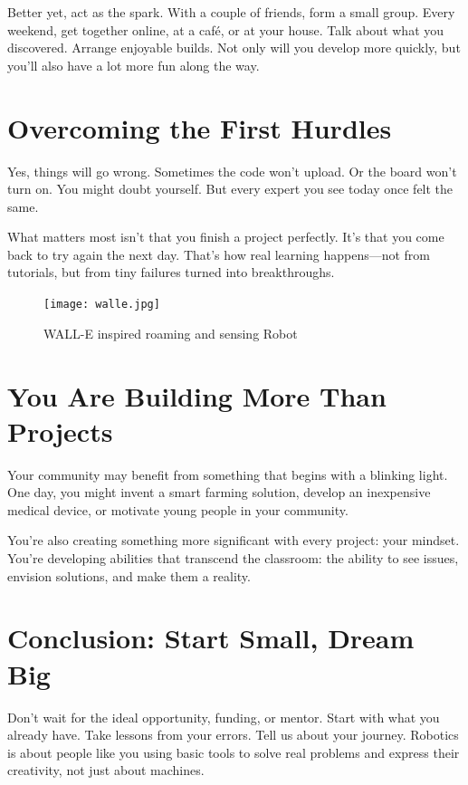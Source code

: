 \documentclass[a4paper,10pt,twocolumn]{memoir}
\begin{document}
Better yet, act as the spark. With a couple of friends, form a small group. Every weekend, get together online, at a café, or at your house. Talk about what you discovered. Arrange enjoyable builds. Not only will you develop more quickly, but you’ll also have a lot more fun along the way.
\section*{Overcoming the First Hurdles}
Yes, things will go wrong. Sometimes the code won’t upload. Or the board won’t turn on. You might doubt yourself. But every expert you see today once felt the same.

What matters most isn’t that you finish a project perfectly. It’s that you come back to try again the next day. That’s how real learning happens—not from tutorials, but from tiny failures turned into breakthroughs.
\begin{figure}[ht]
  \centering
  \texttt{[image: walle.jpg]}
  \caption*{WALL-E inspired roaming and sensing Robot}
  \label{fig2}
\end{figure}
\section*{You Are Building More Than Projects}
Your community may benefit from something that begins with a blinking light. One day, you might invent a smart farming solution, develop an inexpensive medical device, or motivate young people in your community.

You’re also creating something more significant with every project: your mindset. You’re developing abilities that transcend the classroom: the ability to see issues, envision solutions, and make them a reality.
\section*{Conclusion: Start Small, Dream Big}
Don’t wait for the ideal opportunity, funding, or mentor. Start with what you already have. Take lessons from your errors. Tell us about your journey. Robotics is about people like you using basic tools to solve real problems and express their creativity, not just about machines.
\end{document}
